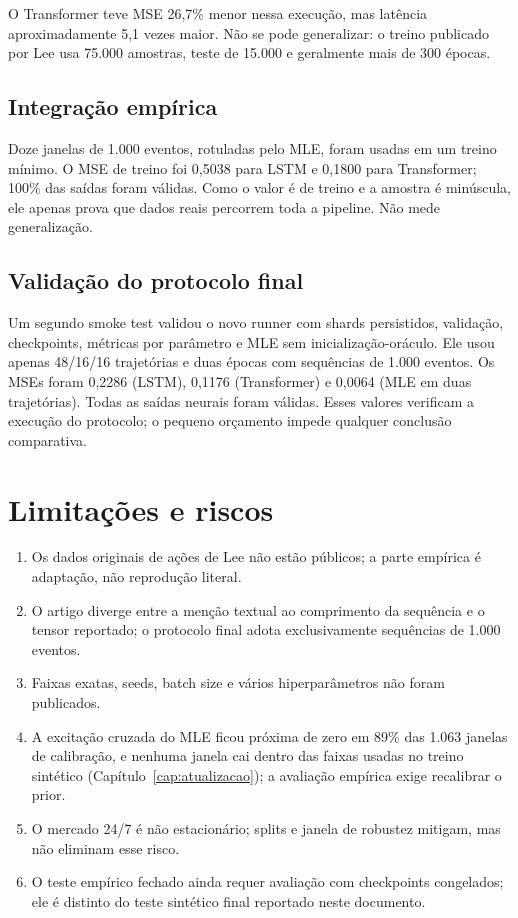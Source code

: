 \documentclass[12pt,a4paper]{report}
\begin{document}
O Transformer teve MSE 26,7\% menor nessa execução, mas latência aproximadamente
5,1 vezes maior. Não se pode generalizar: o treino publicado por Lee usa 75.000
amostras, teste de 15.000 e geralmente mais de 300 épocas.

\section{Integração empírica}

Doze janelas de 1.000 eventos, rotuladas pelo MLE, foram usadas em um treino mínimo.
O MSE de treino foi 0,5038 para LSTM e 0,1800 para Transformer; 100\% das saídas
foram válidas. Como o valor é de treino e a amostra é minúscula, ele apenas prova que
dados reais percorrem toda a pipeline. Não mede generalização.

\section{Validação do protocolo final}

Um segundo smoke test validou o novo runner com shards persistidos, validação,
checkpoints, métricas por parâmetro e MLE sem inicialização-oráculo. Ele usou apenas
48/16/16 trajetórias e duas épocas com sequências de 1.000 eventos. Os MSEs foram
0,2286 (LSTM), 0,1176 (Transformer) e 0,0064 (MLE em duas trajetórias). Todas as
saídas neurais foram válidas. Esses valores verificam a execução do protocolo; o
pequeno orçamento impede qualquer conclusão comparativa.

\chapter{Limitações e riscos}

\begin{enumerate}
  \item Os dados originais de ações de Lee não estão públicos; a parte empírica é
  adaptação, não reprodução literal.
  \item O artigo diverge entre a menção textual ao comprimento da sequência e o tensor
  reportado; o protocolo final adota exclusivamente sequências de 1.000 eventos.
  \item Faixas exatas, seeds, batch size e vários hiperparâmetros não foram publicados.
  \item A excitação cruzada do MLE ficou próxima de zero em 89\% das 1.063 janelas de
  calibração, e nenhuma janela cai dentro das faixas usadas no treino sintético
  (Capítulo~\ref{cap:atualizacao}); a avaliação empírica exige recalibrar o prior.
  \item O mercado 24/7 é não estacionário; splits e janela de robustez mitigam, mas
  não eliminam esse risco.
  \item O teste empírico fechado ainda requer avaliação com checkpoints congelados; ele
  é distinto do teste sintético final reportado neste documento.
\end{enumerate}
\end{document}
